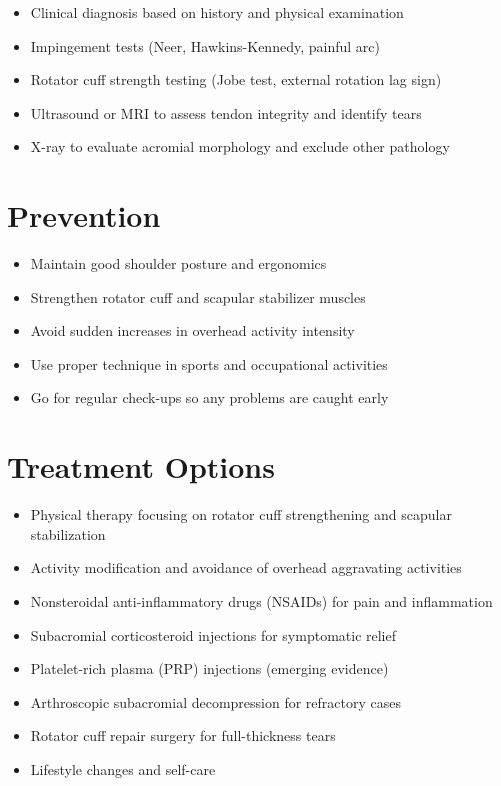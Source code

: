 \begin{itemize}[noitemsep]
  \item Clinical diagnosis based on history and physical examination
  \item Impingement tests (Neer, Hawkins-Kennedy, painful arc)
  \item Rotator cuff strength testing (Jobe test, external rotation lag sign)
  \item Ultrasound or MRI to assess tendon integrity and identify tears
  \item X-ray to evaluate acromial morphology and exclude other pathology
\end{itemize}

\section{Prevention}

\begin{itemize}[noitemsep]
  \item Maintain good shoulder posture and ergonomics
  \item Strengthen rotator cuff and scapular stabilizer muscles
  \item Avoid sudden increases in overhead activity intensity
  \item Use proper technique in sports and occupational activities
  \item Go for regular check-ups so any problems are caught early
\end{itemize}

\section{Treatment Options}

\begin{itemize}[noitemsep]
  \item Physical therapy focusing on rotator cuff strengthening and scapular stabilization
  \item Activity modification and avoidance of overhead aggravating activities
  \item Nonsteroidal anti-inflammatory drugs (NSAIDs) for pain and inflammation
  \item Subacromial corticosteroid injections for symptomatic relief
  \item Platelet-rich plasma (PRP) injections (emerging evidence)
  \item Arthroscopic subacromial decompression for refractory cases
  \item Rotator cuff repair surgery for full-thickness tears
  \item Lifestyle changes and self-care
\end{itemize}

